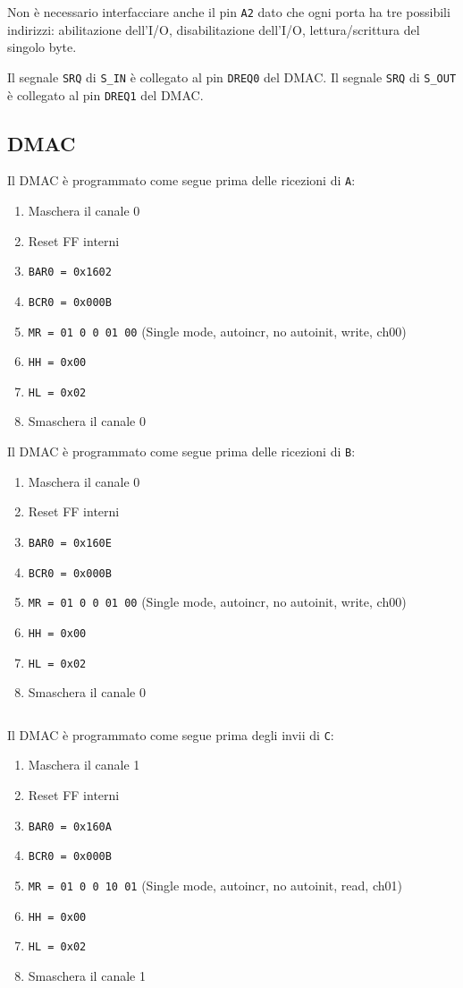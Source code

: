 \documentclass[a4paper]{article}
\begin{document}
Non è necessario interfacciare anche il pin \texttt{A2} dato che ogni porta ha tre possibili indirizzi: abilitazione dell'I/O, disabilitazione dell'I/O, lettura/scrittura del singolo byte. 

Il segnale \texttt{SRQ} di \texttt{S\_IN} è collegato al pin \texttt{DREQ0} del DMAC.
Il segnale \texttt{SRQ} di \texttt{S\_OUT} è collegato al pin \texttt{DREQ1} del DMAC.

\subsection{DMAC}
Il DMAC è programmato come segue prima delle ricezioni di \texttt{A}:
\begin{enumerate}
\item Maschera il canale 0
\item Reset FF interni
\item \texttt{BAR0 = 0x1602}
\item \texttt{BCR0 = 0x000B}
\item \texttt{MR = 01 0 0 01 00} (Single mode, autoincr, no autoinit, write, ch00)
\item \texttt{HH = 0x00}
\item \texttt{HL = 0x02}
\item Smaschera il canale 0
\end{enumerate}

Il DMAC è programmato come segue prima delle ricezioni di \texttt{B}:
\begin{enumerate}
\item Maschera il canale 0
\item Reset FF interni
\item \texttt{BAR0 = 0x160E}
\item \texttt{BCR0 = 0x000B}
\item \texttt{MR = 01 0 0 01 00} (Single mode, autoincr, no autoinit, write, ch00)
\item \texttt{HH = 0x00}
\item \texttt{HL = 0x02}
\item Smaschera il canale 0
\end{enumerate}

\begin{verbatim}
\end{verbatim}

Il DMAC è programmato come segue prima degli invii di \texttt{C}:
\begin{enumerate}
\item Maschera il canale 1
\item Reset FF interni
\item \texttt{BAR0 = 0x160A}
\item \texttt{BCR0 = 0x000B}
\item \texttt{MR = 01 0 0 10 01} (Single mode, autoincr, no autoinit, read, ch01)
\item \texttt{HH = 0x00}
\item \texttt{HL = 0x02}
\item Smaschera il canale 1
\end{enumerate}
\end{document}
